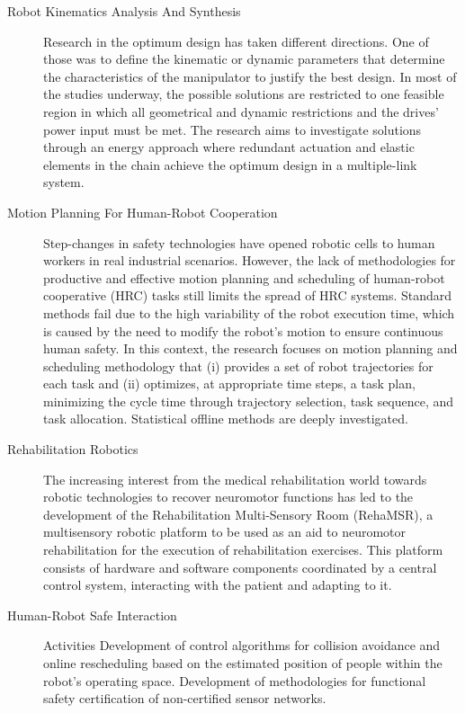 \documentclass[a4paper,9pt]{extarticle}
\newcounter{industrial_contracts_cnt}
\begin{document}
\begin{description}
   \item[Robot Kinematics Analysis And Synthesis] Research in the optimum design has taken different directions. One of those was to define the kinematic or dynamic parameters that determine the characteristics of the manipulator to justify the best design. In most of the studies underway, the possible solutions are restricted to one feasible region in which all geometrical and dynamic restrictions and the drives' power input must be met. The research aims to investigate solutions through an energy approach where redundant actuation and elastic elements in the chain achieve the optimum design in a multiple-link system.
   \item[Motion Planning For Human-Robot Cooperation]	Step-changes in safety technologies have opened robotic cells to human workers in real industrial scenarios. However, the lack of methodologies for productive and effective motion planning and scheduling of human-robot cooperative (HRC) tasks still limits the spread of HRC systems. Standard methods fail due to the high variability of the robot execution time, which is caused by the need to modify the robot's motion to ensure continuous human safety. In this context, the research focuses on motion planning and scheduling methodology that (i) provides a set of robot trajectories for each task and (ii) optimizes, at appropriate time steps, a task plan, minimizing the cycle time through trajectory selection, task sequence, and task allocation. Statistical offline methods are deeply investigated.
   \item[Rehabilitation Robotics] The increasing interest from the medical rehabilitation world towards robotic technologies to recover neuromotor functions has led to the development of the Rehabilitation Multi-Sensory Room (RehaMSR), a multisensory robotic platform to be used as an aid to neuromotor rehabilitation for the execution of rehabilitation exercises. This platform consists of hardware and software components coordinated by a central control system, interacting with the patient and adapting to it.
   \item[Human-Robot Safe Interaction] Activities Development of control algorithms for collision avoidance and online rescheduling based on the estimated position of people within the robot's operating space. Development of methodologies for functional safety certification of non-certified sensor networks.
\end{description}
\end{document}
